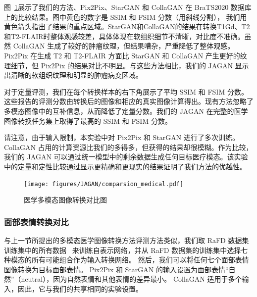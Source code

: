 图~\ref{fig:comparsion_medical}展示了我们的方法、Pix2Pix、StarGAN 和 CollaGAN 在 BraTS2020 数据库上的比较结果。图中黄色的数字是 SSIM 和 FSIM 分数（用斜线分割）， 我们用黄色箭头指出了结果的重点区域。StarGAN和CollaGAN的结果在转换T1Gd、T2和T2-FLAIR时整体观感较差，具体体现在软组织细节不清晰，对比度不准确。虽然 CollaGAN 生成了较好的肿瘤纹理，但结果嘈杂，严重降低了整体观感。 Pix2Pix 在生成 T2 和 T2-FLAIR 方面比 StarGAN 和 CollaGAN 产生更好的纹理细节，但 Pix2Pix 的结果对比不明显。与这些方法相比，我们的 JAGAN 显示出清晰的软组织纹理和明显的肿瘤病变区域。

对于定量评测，我们在每个转换样本的右下角展示了平均 SSIM 和 FSIM 分数。这些报告的评测分数由转换后的图像和相应的真实图像计算得出。现有方法忽略了多模态图像中的互补信息，从而降低了定量分数。我们的 JAGAN 在完整的医学图像转换任务集上取得了最高的 SSIM 和 FSIM 分数。

请注意，由于输入限制，本实验中对 Pix2Pix 和 StarGAN 进行了多次训练。 CollaGAN 占用的计算资源比我们的多得多，但获得的结果却很模糊。作为比较，我们的 JAGAN 可以通过统一模型中的剩余数据生成任何目标医疗模态。该实验中的定量和定性比较通过显示更精确和更现实的结果证明了我们方法的优越性。

\begin{figure}
	\begin{center}
		\texttt{[image: figures/JAGAN/comparsion\_medical.pdf]}
	\end{center}
	\caption{医学多模态图像转换对比图}
	\label{fig:comparsion_medical}
\end{figure}

\subsubsection{面部表情转换对比}
与上一节所提出的多模态医学图像转换方法评测方法类似，我们取 RaFD 数据集训练集中的所有数据~\cite{langner2010presentation} 来训练自表示网络，并从 RaFD 数据集的训练集中选择七种模态的所有可能组合作为输入转换网络。
然后，我们可以将任何七个面部表情图像转换为目标面部表情。 Pix2Pix 和 StarGAN 的输入设置为面部表情“自然”（neutral），因为自然表情和其他表情的差异最小。 CollaGAN 适用于多个输入，因此，它与我们的共享相同的实验设置。

